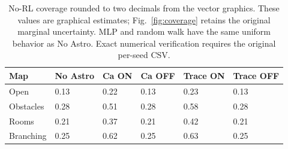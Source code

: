 \begin{table}[htbp]\centering\footnotesize
\setlength{\tabcolsep}{3.5pt}
\caption{No-RL coverage rounded to two decimals from the vector graphics. These values are graphical estimates; Fig.~\ref{fig:coverage} retains the original marginal uncertainty. MLP and random walk have the same uniform behavior as No Astro. Exact numerical verification requires the original per-seed CSV.}\label{tab:coverage_means}
\begin{tabular}{@{}llllll@{}}\toprule
Map & No Astro & Ca ON & Ca OFF & Trace ON & Trace OFF\\\midrule
Open & 0.13 & 0.22 & 0.13 & 0.23 & 0.13\\
Obstacles & 0.28 & 0.51 & 0.28 & 0.58 & 0.28\\
Rooms & 0.21 & 0.37 & 0.21 & 0.42 & 0.21\\
Branching & 0.25 & 0.62 & 0.25 & 0.63 & 0.25\\
\bottomrule\end{tabular}
\end{table}
